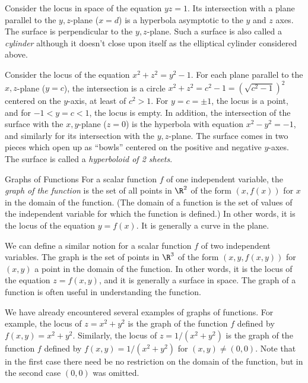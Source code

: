 \nextex
{}
Consider the locus in space of the equation $yz = 1$.   Its intersection
with a plane parallel to the $y,z$-plane ($x = d$) is a hyperbola
asymptotic to the $y$ and $z$ axes.  The surface is perpendicular
to the $y,z$-plane.  Such a surface is also called a {\it cylinder\/}
although it doesn't close upon itself as the elliptical cylinder considered
above.
\endexample

\nextex
{}
Consider the locus of the equation $x^2 + z^2 = y^2 - 1$.  For
each plane parallel to the $x,z$-plane ($y = c$), the intersection
is a circle $x^2 + z^2 = c^2 - 1 = (\sqrt{c^2 - 1})^2$ centered
on the $y$-axis, at least of $c^2 > 1$.  For $y = c = \pm 1$,
the locus is a point, and for $-1 < y = c < 1$, the locus is
empty.   In addition, the intersection of the surface with the
$x,y$-plane ($z = 0$) is the hyperbola with equation $x^2 - y^2
 = -1$, and similarly for its intersection with the $y,z$-plane.
The surface comes in two pieces which open up as ``bowls'' centered
on the positive and negative $y$-axes.   The surface is called
a {\it hyperboloid of 2 sheets}.    
\medskip
\centerline{}
\medskip
\endexample
\subhead Graphs of Functions \endsubhead
For a scalar function $f$ of one independent variable, 
the {\it graph of the function\/} is the set of
%
all points in $\R^2$  of the form  $(x, f(x))$
for $x$ in the domain of the function.   (The domain of a function
is the set of values of the independent variable for which the
%
function is defined.)  In other words, it is the locus of the
equation $y = f(x)$.  It is generally a curve in the plane.

We can define a similar notion for a scalar function $f$ of two
independent variables.  The graph is the
set of points in $\R^3$  of the form $(x, y, f(x,y))$
for $(x,y)$ a point in the domain of the function.  In other words,
it is the locus of the equation $z = f(x,y)$, and it is generally
a surface in space.
The graph of a function is often useful in understanding the
function.

We have already encountered several examples of graphs of functions.
For example, the locus of $z = x^2 + y^2$ is the graph of the
function $f$ defined by $f(x,y) = x^2 +y^2$.   Similarly, the locus
of $z = 1/(x^2 + y^2)$ is the graph of the function $f$ defined by
$f(x,y) = 1/(x^2 + y^2)$ for $(x,y) \not= (0,0)$. 
  Note that in the first case there need
be no restriction on the domain of the function, but in the second
case $(0,0)$ was omitted.  

